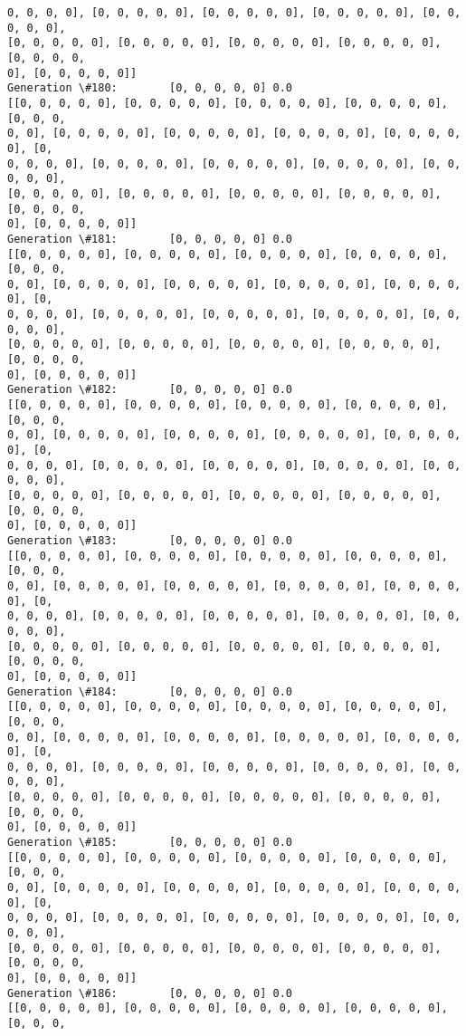 \documentclass[11pt]{article}
\begin{document}
\begin{Verbatim}[commandchars=\\\{\}]
0, 0, 0, 0], [0, 0, 0, 0, 0], [0, 0, 0, 0, 0], [0, 0, 0, 0, 0], [0, 0, 0, 0, 0],
[0, 0, 0, 0, 0], [0, 0, 0, 0, 0], [0, 0, 0, 0, 0], [0, 0, 0, 0, 0], [0, 0, 0, 0,
0], [0, 0, 0, 0, 0]]
Generation \#180:        [0, 0, 0, 0, 0] 0.0
[[0, 0, 0, 0, 0], [0, 0, 0, 0, 0], [0, 0, 0, 0, 0], [0, 0, 0, 0, 0], [0, 0, 0,
0, 0], [0, 0, 0, 0, 0], [0, 0, 0, 0, 0], [0, 0, 0, 0, 0], [0, 0, 0, 0, 0], [0,
0, 0, 0, 0], [0, 0, 0, 0, 0], [0, 0, 0, 0, 0], [0, 0, 0, 0, 0], [0, 0, 0, 0, 0],
[0, 0, 0, 0, 0], [0, 0, 0, 0, 0], [0, 0, 0, 0, 0], [0, 0, 0, 0, 0], [0, 0, 0, 0,
0], [0, 0, 0, 0, 0]]
Generation \#181:        [0, 0, 0, 0, 0] 0.0
[[0, 0, 0, 0, 0], [0, 0, 0, 0, 0], [0, 0, 0, 0, 0], [0, 0, 0, 0, 0], [0, 0, 0,
0, 0], [0, 0, 0, 0, 0], [0, 0, 0, 0, 0], [0, 0, 0, 0, 0], [0, 0, 0, 0, 0], [0,
0, 0, 0, 0], [0, 0, 0, 0, 0], [0, 0, 0, 0, 0], [0, 0, 0, 0, 0], [0, 0, 0, 0, 0],
[0, 0, 0, 0, 0], [0, 0, 0, 0, 0], [0, 0, 0, 0, 0], [0, 0, 0, 0, 0], [0, 0, 0, 0,
0], [0, 0, 0, 0, 0]]
Generation \#182:        [0, 0, 0, 0, 0] 0.0
[[0, 0, 0, 0, 0], [0, 0, 0, 0, 0], [0, 0, 0, 0, 0], [0, 0, 0, 0, 0], [0, 0, 0,
0, 0], [0, 0, 0, 0, 0], [0, 0, 0, 0, 0], [0, 0, 0, 0, 0], [0, 0, 0, 0, 0], [0,
0, 0, 0, 0], [0, 0, 0, 0, 0], [0, 0, 0, 0, 0], [0, 0, 0, 0, 0], [0, 0, 0, 0, 0],
[0, 0, 0, 0, 0], [0, 0, 0, 0, 0], [0, 0, 0, 0, 0], [0, 0, 0, 0, 0], [0, 0, 0, 0,
0], [0, 0, 0, 0, 0]]
Generation \#183:        [0, 0, 0, 0, 0] 0.0
[[0, 0, 0, 0, 0], [0, 0, 0, 0, 0], [0, 0, 0, 0, 0], [0, 0, 0, 0, 0], [0, 0, 0,
0, 0], [0, 0, 0, 0, 0], [0, 0, 0, 0, 0], [0, 0, 0, 0, 0], [0, 0, 0, 0, 0], [0,
0, 0, 0, 0], [0, 0, 0, 0, 0], [0, 0, 0, 0, 0], [0, 0, 0, 0, 0], [0, 0, 0, 0, 0],
[0, 0, 0, 0, 0], [0, 0, 0, 0, 0], [0, 0, 0, 0, 0], [0, 0, 0, 0, 0], [0, 0, 0, 0,
0], [0, 0, 0, 0, 0]]
Generation \#184:        [0, 0, 0, 0, 0] 0.0
[[0, 0, 0, 0, 0], [0, 0, 0, 0, 0], [0, 0, 0, 0, 0], [0, 0, 0, 0, 0], [0, 0, 0,
0, 0], [0, 0, 0, 0, 0], [0, 0, 0, 0, 0], [0, 0, 0, 0, 0], [0, 0, 0, 0, 0], [0,
0, 0, 0, 0], [0, 0, 0, 0, 0], [0, 0, 0, 0, 0], [0, 0, 0, 0, 0], [0, 0, 0, 0, 0],
[0, 0, 0, 0, 0], [0, 0, 0, 0, 0], [0, 0, 0, 0, 0], [0, 0, 0, 0, 0], [0, 0, 0, 0,
0], [0, 0, 0, 0, 0]]
Generation \#185:        [0, 0, 0, 0, 0] 0.0
[[0, 0, 0, 0, 0], [0, 0, 0, 0, 0], [0, 0, 0, 0, 0], [0, 0, 0, 0, 0], [0, 0, 0,
0, 0], [0, 0, 0, 0, 0], [0, 0, 0, 0, 0], [0, 0, 0, 0, 0], [0, 0, 0, 0, 0], [0,
0, 0, 0, 0], [0, 0, 0, 0, 0], [0, 0, 0, 0, 0], [0, 0, 0, 0, 0], [0, 0, 0, 0, 0],
[0, 0, 0, 0, 0], [0, 0, 0, 0, 0], [0, 0, 0, 0, 0], [0, 0, 0, 0, 0], [0, 0, 0, 0,
0], [0, 0, 0, 0, 0]]
Generation \#186:        [0, 0, 0, 0, 0] 0.0
[[0, 0, 0, 0, 0], [0, 0, 0, 0, 0], [0, 0, 0, 0, 0], [0, 0, 0, 0, 0], [0, 0, 0,

\end{Verbatim}
\end{document}
